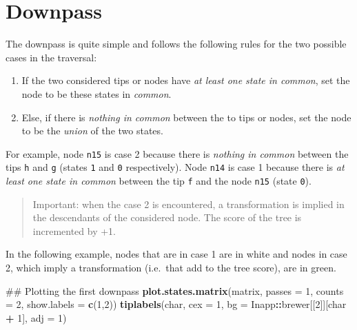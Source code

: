\documentclass[]{book}
\newenvironment{Shaded}{\begin{snugshade}}{\end{snugshade}}
\newcommand{\KeywordTok}[1]{\textcolor[rgb]{0.13,0.29,0.53}{\textbf{#1}}}
\newcommand{\DataTypeTok}[1]{\textcolor[rgb]{0.13,0.29,0.53}{#1}}
\newcommand{\DecValTok}[1]{\textcolor[rgb]{0.00,0.00,0.81}{#1}}
\newcommand{\StringTok}[1]{\textcolor[rgb]{0.31,0.60,0.02}{#1}}
\newcommand{\OperatorTok}[1]{\textcolor[rgb]{0.81,0.36,0.00}{\textbf{#1}}}
\newcommand{\NormalTok}[1]{#1}
\providecommand{\tightlist}{%
  \setlength{\itemsep}{0pt}\setlength{\parskip}{0pt}}
\theoremstyle{definition}
\theoremstyle{definition}
\theoremstyle{definition}
\theoremstyle{remark}
\begin{document}
\hypertarget{downpass}{%
\section{Downpass}\label{downpass}}

The downpass is quite simple and follows the following rules for the two
possible cases in the traversal:

\begin{enumerate}
\def\labelenumi{\arabic{enumi}.}
\tightlist
\item
  If the two considered tips or nodes have \emph{at least one state in
  common}, set the node to be these states in \emph{common}.
\item
  Else, if there is \emph{nothing in common} between the to tips or
  nodes, set the node to be the \emph{union} of the two states.
\end{enumerate}

For example, node \texttt{n15} is case 2 because there is \emph{nothing
in common} between the tips \texttt{h} and \texttt{g} (states \texttt{1}
and \texttt{0} respectively). Node \texttt{n14} is case 1 because there
is \emph{at least one state in common} between the tip \texttt{f} and
the node \texttt{n15} (state \texttt{0}).

\begin{quote}
Important: when the case 2 is encountered, a transformation is implied
in the descendants of the considered node. The score of the tree is
incremented by +1.
\end{quote}

In the following example, nodes that are in case 1 are in white and
nodes in case 2, which imply a transformation (i.e.~that add to the tree
score), are in green.

\begin{Shaded}
\begin{Highlighting}[]
\NormalTok{## Plotting the first downpass}
\KeywordTok{plot.states.matrix}\NormalTok{(matrix, }\DataTypeTok{passes =} \DecValTok{1}\NormalTok{, }\DataTypeTok{counts =} \DecValTok{2}\NormalTok{, }\DataTypeTok{show.labels =} \KeywordTok{c}\NormalTok{(}\DecValTok{1}\NormalTok{,}\DecValTok{2}\NormalTok{))}
\KeywordTok{tiplabels}\NormalTok{(char, }\DataTypeTok{cex =} \DecValTok{1}\NormalTok{, }\DataTypeTok{bg =}\NormalTok{ Inapp}\OperatorTok{::}\NormalTok{brewer[[}\DecValTok{2}\NormalTok{]][char }\OperatorTok{+}\StringTok{ }\DecValTok{1}\NormalTok{], }\DataTypeTok{adj =} \DecValTok{1}\NormalTok{)}
\end{Highlighting}
\end{Shaded}
\end{document}
